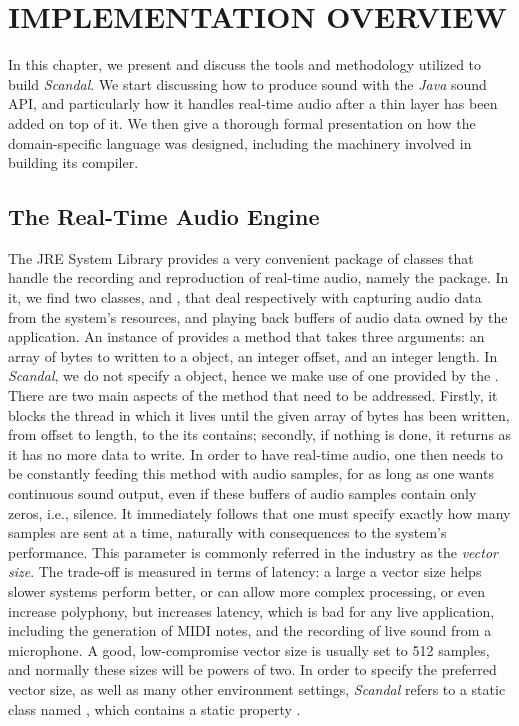 \chapter{IMPLEMENTATION OVERVIEW}

In this chapter, we present and discuss the tools and methodology utilized to build \emph{Scandal}. We start discussing how to produce sound with the \emph{Java} sound API, and particularly how it handles real-time audio after a thin layer has been added on top of it. We then give a thorough formal presentation on how the domain-specific language was designed, including the machinery involved in building its compiler.

\section{The Real-Time Audio Engine}

The JRE System Library provides a very convenient package of classes that handle the recording and reproduction of real-time audio, namely the  package. In it, we find two classes,  and , that deal respectively with capturing audio data from the system's resources, and playing back buffers of audio data owned by the application. An instance of  provides a  method that takes three arguments: an array of bytes to written to a  object, an integer offset, and an integer length. In \emph{Scandal}, we do not specify a  object, hence we make use of one provided by the . There are two main aspects of the  method that need to be addressed. Firstly, it blocks the thread in which it lives until the given array of bytes has been written, from offset to length, to the  its  contains; secondly, if nothing is done, it returns as it has no more data to write. In order to have real-time audio, one then needs to be constantly feeding this  method with audio samples, for as long as one wants continuous sound output, even if these buffers of audio samples contain only zeros, i.e., silence. It immediately follows that one must specify exactly how many samples are sent at a time, naturally with consequences to the system's performance. This parameter is commonly referred in the industry as the \emph{vector size}. The trade-off is measured in terms of latency: a large a vector size helps slower systems perform better, or can allow more complex processing, or even increase polyphony, but increases latency, which is bad for any live application, including the generation of MIDI notes, and the recording of live sound from a microphone. A good, low-compromise vector size is usually set to 512 samples, and normally these sizes will be powers of two. In order to specify the preferred vector size, as well as many other environment settings, \emph{Scandal} refers to a static class named , which contains a static property .

